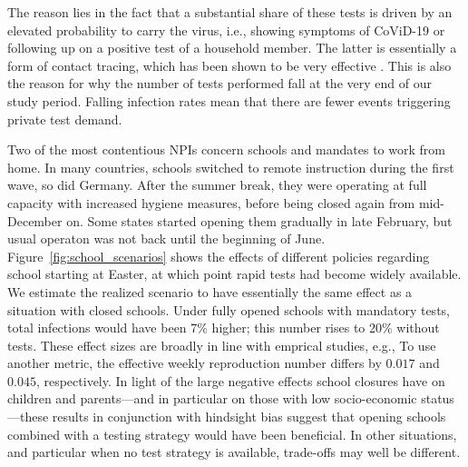 The reason lies in the fact that a substantial share of these tests is driven by an
elevated probability to carry the virus, i.e., showing symptoms of CoViD-19 or following
up on a positive test of a household member. The latter is essentially a form of contact
tracing, which has been shown to be very effective \citep{Contreras2021,
Kretzschmar2020}. This is also the reason for why the number of tests performed fall at
the very end of our study period. Falling infection rates mean that there are fewer
events triggering private test demand.

Two of the most contentious NPIs concern schools and mandates to work from home. In many
countries, schools switched to remote instruction during the first wave, so did Germany.
After the summer break, they were operating at full capacity with increased hygiene
measures, before being closed again from mid-December on. Some states started opening
them gradually in late February, but usual operaton was not back until the beginning of
June. Figure~\ref{fig:school_scenarios} shows the effects of different policies
regarding school starting at Easter, at which point rapid tests had become widely
available. We estimate the realized scenario to have essentially the same effect as a
situation with closed schools. Under fully opened schools with mandatory tests, total
infections would have been 7\% higher; this number rises to 20\% without tests. These
effect sizes are broadly in line with emprical studies, e.g., \citet{Vlachos2021}
 To use another metric, the
effective weekly reproduction number differs by $0.017$ and $0.045$, respectively. In
light of the large negative effects school closures have on children and
parents---and in particular on those with low
socio-economic status---these results in conjunction with hindsight bias suggest that
opening schools combined with a testing strategy would have been beneficial. In other
situations, and particular when no test strategy is available, trade-offs may well be
different.

